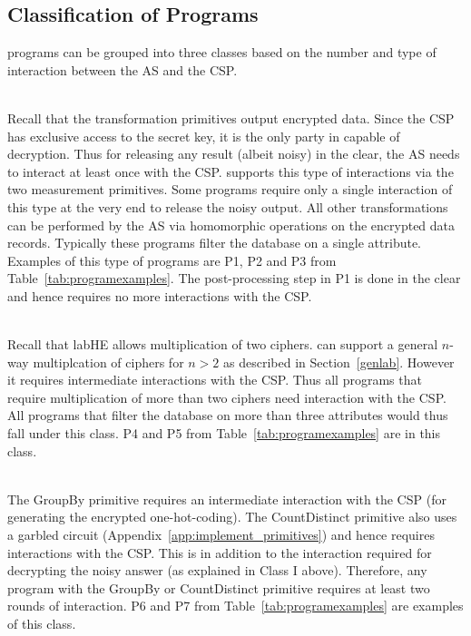 \subsection{Classification of \system Programs}
\system programs can be grouped into three classes based on the number and type of interaction between the \textsf{AS} and the \textsf{CSP}. 

\\
Recall that the transformation primitives output encrypted data.  Since  the \textsf{CSP} has exclusive access to the secret key, it is the only party in \system capable of decryption. Thus for releasing any result (albeit noisy) in the clear, the \textsf{AS} needs to interact at least once with the \textsf{CSP}. \system supports this type of interactions via the two measurement primitives. Some \system programs require only a single interaction of this type at the very end to release the noisy output. All other transformations can be performed by the \textsf{AS} via homomorphic operations on the encrypted data records. Typically these programs filter the database on a single attribute. Examples of this type of programs are P1, P2 and P3 from Table~\ref{tab:programexamples}. The post-processing step in P1 is done in the clear and hence requires no more interactions with the \textsf{CSP}.



\\
Recall that \textsf{labHE} allows multiplication of two ciphers. \system can support a general $n$-way multiplcation of ciphers for $n > 2$ as described in Section~\ref{genlab}. However it requires intermediate interactions with the \textsf{CSP}. Thus all \system programs that require multiplication of more than two ciphers need interaction with the \textsf{CSP}.  All programs that filter the database on more than three attributes would thus fall under this class. P4 and P5 from Table~\ref{tab:programexamples} are in this class.

\\
 The \textsf{GroupBy} primitive requires an intermediate interaction with the \textsf{CSP} (for generating the encrypted one-hot-coding). The \textsf{CountDistinct} primitive also uses a garbled circuit (Appendix~\ref{app:implement_primitives}) and hence requires interactions with the \textsf{CSP}. This is in addition to the interaction required for decrypting the noisy answer (as explained in Class I above). Therefore, any program with the \textsf{GroupBy} or \textsf{CountDistinct} primitive requires at least two rounds of interaction. P6 and P7 from Table~\ref{tab:programexamples} are examples of this class. 


